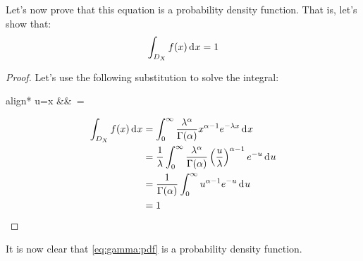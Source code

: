 \documentclass[12pt]{article}
\begin{document}
Let's now prove that this equation is a probability density function. That is, let's show that:
\begin{equation}
	\int_{D_X} f(x)\mathop{}\!\mathrm{d^{}}x = 1
\end{equation}
\begin{proof}
	Let's use the following substitution to solve the integral:
	\begin{empheq}[box=\widefbox]{align*}
		u=\lambda x	&&\,	=\lambda{}
	\end{empheq}
	\begin{equation}
		\begin{split}
			\int_{D_X} f(x)\mathop{}\!\mathrm{d^{}}x	&=	\int^\infty_0\frac{\lambda^\alpha}{\Gamma(\alpha)}x^{\alpha -1}e^{-\lambda x}\mathop{}\!\mathrm{d^{}}x\\
									&=	\frac{1}{\lambda}\int^\infty_0\frac{\lambda^\alpha}{\Gamma(\alpha)}\left(\frac{u}{\lambda}\right)^{\alpha-1}e^{-u}\mathop{}\!\mathrm{d^{}}u\\
									&=	\frac{1}{\Gamma(\alpha)}\int^\infty_0 u^{\alpha-1}e^{-u}\mathop{}\!\mathrm{d^{}}u\\
									&=	1
		\end{split}
	\end{equation}
\end{proof}
It is now clear that \autoref{eq:gamma:pdf} is a probability density function.
\end{document}
